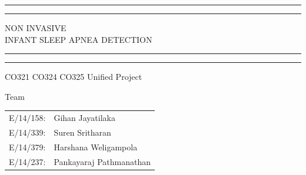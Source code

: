 \documentclass{report}
\begin{document}
\begin{titlepage} %

	\centering %
	
	\scshape %
	
	\vspace*{\baselineskip} %
	
	
	\rule{\textwidth}{1.6pt}\vspace*{-\baselineskip}\vspace*{2pt} %
	\rule{\textwidth}{0.4pt} %
	
	\vspace{1.5\baselineskip} %
	
	{\LARGE NON INVASIVE \\\vspace{5.0pt}INFANT SLEEP APNEA DETECTION} %
	
	\vspace{1.5\baselineskip} %
	
	\rule{\textwidth}{0.4pt}\vspace*{-\baselineskip}\vspace{3.2pt} %
	\rule{\textwidth}{1.6pt} %
	
	\vspace{2cm} %
	
	
	CO321 CO324 CO325 Unified Project %
	
	\vspace*{6cm} %
	
	
	Team
	
	\vspace{0.5\baselineskip} %
	
	{\scshape\Large \begin{tabular}{c l}
	     E/14/158: &Gihan Jayatilaka\\E/14/339: &Suren Sritharan\\E/14/379:& Harshana Weligampola\\E/14/237: &Pankayaraj Pathmanathan\\
	\end{tabular} } %
	

\end{titlepage}
\end{document}
